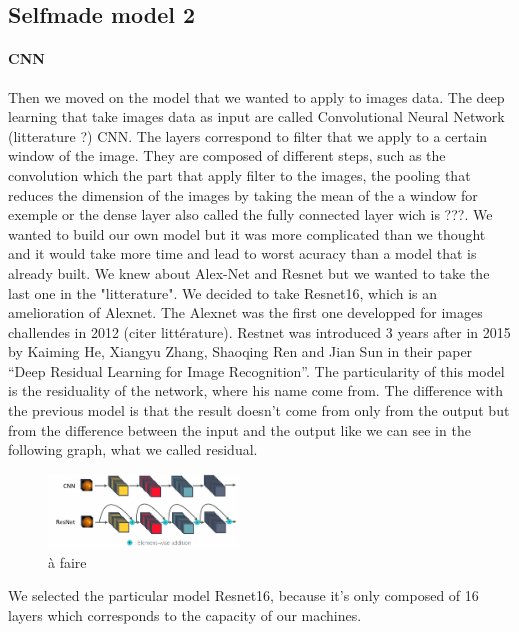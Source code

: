 \documentclass[12pt]{article}
\begin{document}
\subsection{Selfmade model 2}

\paragraph{CNN} 


Then we moved on the model that we wanted to apply to images data. The deep learning that take images data as input are called Convolutional Neural Network (litterature ?) CNN. The layers correspond to filter that we apply to a certain window of the image. They are composed of different steps, such as the convolution which the part that apply filter to the images, the pooling that reduces the dimension of the images by taking the mean of the a window for exemple or the dense layer also called the fully connected layer wich is ???. We wanted to build our own model but it was more complicated than we thought and it would take more time and lead to worst acuracy than a model that is already built. We knew about Alex-Net and Resnet but we wanted to take the last one in the "litterature". We decided to take Resnet16, which is an amelioration of Alexnet. The Alexnet was the first one developped for images challendes in 2012 (citer littérature). Restnet was introduced 3 years after in 2015 by Kaiming He, Xiangyu Zhang, Shaoqing Ren and Jian Sun in their paper “Deep Residual Learning for Image Recognition”. The particularity of this model is the residuality of the network, where his name come from. The difference with the previous model is that the result doesn't come from only from the output but from the difference between the input and the output like we can see in the following graph, what we called residual.



\FloatBarrier
\begin{figure}[ht]
    \centering
    \includegraphics[width=0.45\textwidth]{CNN_RESNET}
    \caption{à faire}
    \label{fig:boxplot}
\end{figure}
\FloatBarrier

We selected the particular model Resnet16, because it's only composed of 16 layers which corresponds to the capacity of our machines. 
\end{document}
